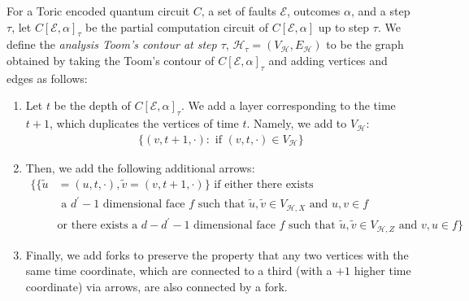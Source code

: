 \begin{definition}
  For a Toric encoded quantum circuit $C$, a set of faults $\mathcal{E}$, outcomes $\alpha$, and a step $\tau$, let $C[\mathcal{E},\alpha]_{\tau}$ be the partial computation circuit of $C[\mathcal{E},\alpha]$ up to step $\tau$. We define the \textit{analysis Toom's contour at step $\tau$}, $\mathcal{H}_{\tau} = (V_{\mathcal{H}}, E_{\mathcal{H}})$ to be the graph obtained by taking the Toom's contour of $C[\mathcal{E},\alpha]_{\tau}$ and adding vertices and edges as follows:
  \begin{enumerate}
    \item Let $t$ be the depth of $C[\mathcal{E},\alpha]_{\tau}$. We add a layer corresponding to the time $t+1$, which duplicates the vertices of time $t$. Namely, we add to $V_{\mathcal{H}}$:
\begin{equation*}
  \begin{split}
    \big\{ (v,t+1, \cdot ) : \text{ if }  (v,t, \cdot ) \in V_{\mathcal{H}}  \big\}
  \end{split}
\end{equation*}
    \item Then, we add the following additional arrows:
        \begin{equation*}
          \begin{split}
            \bigl\{ \bigl\{ \tilde{u} & = (u,t, \cdot ),  \tilde{v}= (v,t+1,\cdot)  \bigr\}  \text{ if  either there exists }\\ 
           & \text{ a } d^{\prime}-1  \text{ dimensional face } f  \text{ such that } \tilde{u},\tilde{v} \in V_{\mathcal{H},X} \text{ and } u,v \in f  \\
          & \text{or there exists a } d - d^{\prime}-1  \text{ dimensional face } f \text{ such that } \tilde{u},\tilde{v} \in V_{\mathcal{H},Z} \text{ and } v,u \in f   \bigr\}  
          \end{split}
        \end{equation*}
      \item Finally, we add forks to preserve the property that any two vertices with the same time coordinate, which are connected to a third (with a $+1$ higher time coordinate) via arrows, are also connected by a fork.
  \end{enumerate}
\end{definition}


